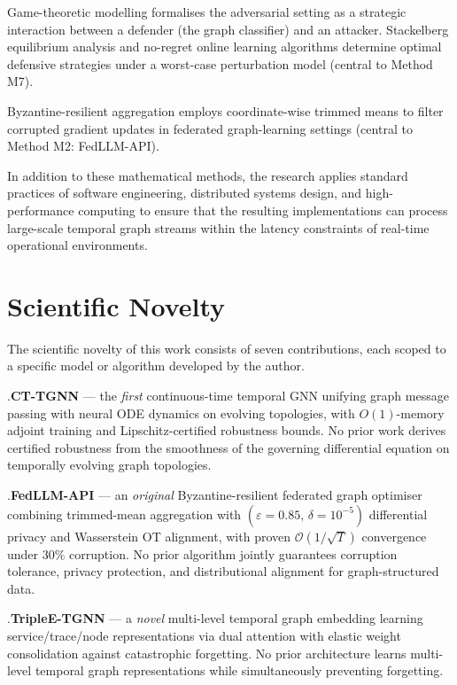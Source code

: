Game-theoretic modelling formalises the adversarial setting as a strategic interaction between a defender (the graph classifier) and an attacker. Stackelberg equilibrium analysis and no-regret online learning algorithms determine optimal defensive strategies under a worst-case perturbation model (central to Method M7).

Byzantine-resilient aggregation employs coordinate-wise trimmed means to filter corrupted gradient updates in federated graph-learning settings (central to Method M2: FedLLM-API).

In addition to these mathematical methods, the research applies standard practices of software engineering, distributed systems design, and high-performance computing to ensure that the resulting implementations can process large-scale temporal graph streams within the latency constraints of real-time operational environments.


\section*{Scientific Novelty}

The scientific novelty of this work consists of seven contributions, each scoped to a specific model or algorithm developed by the author.

.\quad \textbf{CT-TGNN} --- the \emph{first} continuous-time temporal GNN unifying graph message passing with neural ODE dynamics on evolving topologies, with $O(1)$-memory adjoint training and Lipschitz-certified robustness bounds. No prior work derives certified robustness from the smoothness of the governing differential equation on temporally evolving graph topologies.

.\quad \textbf{FedLLM-API} --- an \emph{original} Byzantine-resilient federated graph optimiser combining trimmed-mean aggregation with $(\varepsilon{=}0.85,\,\delta{=}10^{-5})$ differential privacy and Wasserstein OT alignment, with proven $\mathcal{O}(1/\sqrt{T})$ convergence under 30\% corruption. No prior algorithm jointly guarantees corruption tolerance, privacy protection, and distributional alignment for graph-structured data.

.\quad \textbf{TripleE-TGNN} --- a \emph{novel} multi-level temporal graph embedding learning service/trace/node representations via dual attention with elastic weight consolidation against catastrophic forgetting. No prior architecture learns multi-level temporal graph representations while simultaneously preventing forgetting.

